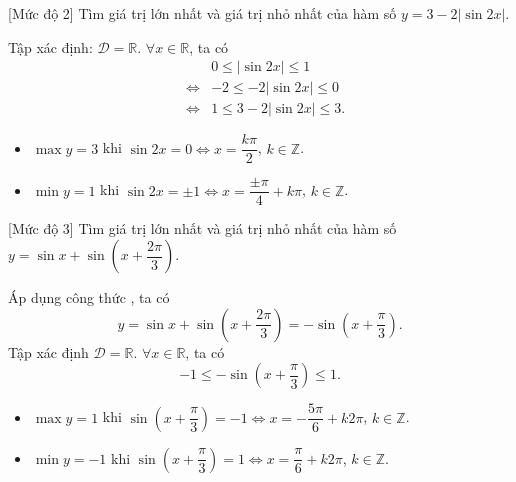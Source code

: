 \begin{bt}%
	[Mức độ 2]
	Tìm giá trị lớn nhất và giá trị nhỏ nhất của hàm số $ y=3-2|\sin 2 x| $.
	\loigiai
	{
		Tập xác định: $ \mathscr{D}=\mathbb{R}$. $ \forall x \in \mathbb{R} $, ta có 
		\begin{eqnarray*}
			&&0\leq	|\sin 2 x|\leq 1\\
			&\Leftrightarrow&  -2\leq	-2|\sin 2 x|\leq 0\\
			&\Leftrightarrow&  1\leq	3-2|\sin 2 x|\leq 3.
		\end{eqnarray*}
	\begin{itemize}
		\item $ \max y=3 $ khi $ \sin 2 x=0 \Leftrightarrow x=\dfrac{k\pi}{2}$, $k\in \mathbb{Z}$.
		\item $ \min y=1$ khi $ \sin 2 x=\pm1 \Leftrightarrow x=\dfrac{\pm\pi}{4}+k\pi$, $k\in \mathbb{Z}$.
	\end{itemize}
	}
\end{bt}

\begin{bt}%
	[Mức độ 3]
	Tìm giá trị lớn nhất và giá trị nhỏ nhất của hàm số $ y=\sin x+\sin \left(x+{\dfrac{2\pi}{3}}\right)$.
	\loigiai
	{
		Áp dụng công thức , ta có
		\begin{equation*}
			y=\sin x + \sin \left (x+\dfrac{2\pi}{3}\right )=-\sin \left (x+\dfrac{\pi}{3}\right ).
		\end{equation*}
		Tập xác định $ \mathscr{D}=\mathbb{R}$. $ \forall x \in \mathbb{R} $, ta có 
		\begin{equation*}
			-1 \leq -\sin \left (x+\dfrac{\pi}{3}\right ) \leq 1.
		\end{equation*}
	\begin{itemize}
		\item $ \max y=1 $ khi $ \sin \left (x+\dfrac{\pi}{3}\right )=-1 \Leftrightarrow x=-\dfrac{5\pi}{6}+k2\pi$, $k\in \mathbb{Z}$.
		\item $ \min y=-1 $ khi $ \sin \left (x+\dfrac{\pi}{3}\right )=1 \Leftrightarrow x=\dfrac{\pi}{6}+k2\pi$, $k\in \mathbb{Z}$.
	\end{itemize}
	}
\end{bt}

